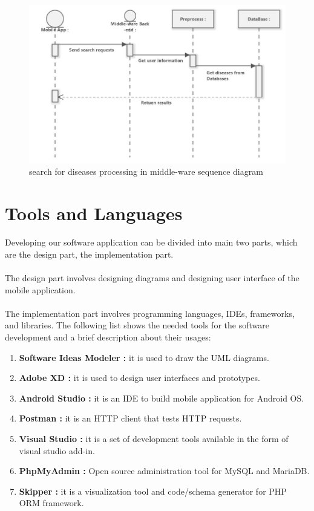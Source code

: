 \begin{figure}
	\centering
	\includegraphics[width = 12cm]{backmatter/figures/Seq/searchback.jpg}
	\caption{search for diseases processing in middle-ware sequence diagram}
\end{figure}

\newpage
\section{Tools and Languages}
Developing our software application can be divided into main two parts, which 
are the design part, the implementation part. \\\\
The design part involves designing diagrams and designing user interface of the
mobile application.\\\\
The implementation part involves programming languages, IDEs, frameworks, and 
libraries. The following list shows the needed tools for the software 
development and a brief description about their usages:\\
\begin{enumerate}
  \item \textbf{Software Ideas Modeler : }it is used to draw the UML diagrams.
  \item \textbf{Adobe XD : }it is used to design user interfaces and prototypes.
  \item \textbf{Android Studio : }it is an IDE to build mobile application for Android OS.
  \item \textbf{Postman : }it is an HTTP client that tests HTTP requests.
  \item \textbf{Visual Studio : }it is a set of development tools available in the form of visual studio add-in.
  \item \textbf{PhpMyAdmin : }Open source administration tool for MySQL and MariaDB. 
  \item \textbf{Skipper : }it is a visualization tool and code/schema generator for PHP ORM framework.
\end{enumerate}
